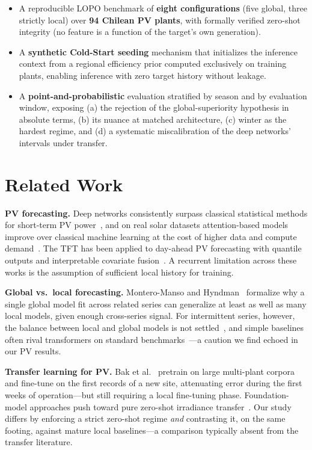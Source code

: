 \documentclass[conference]{IEEEtran}
\begin{document}
\begin{itemize}
\item A reproducible LOPO benchmark of \textbf{eight configurations} (five global, three
strictly local) over \textbf{94 Chilean PV plants}, with formally verified zero-shot
integrity (no feature is a function of the target's own generation).
\item A \textbf{synthetic Cold-Start seeding} mechanism that initializes the inference
context from a regional efficiency prior computed exclusively on training plants, enabling
inference with zero target history without leakage.
\item A \textbf{point-and-probabilistic} evaluation stratified by season and by evaluation
window, exposing (a) the rejection of the global-superiority hypothesis in absolute terms,
(b) its nuance at matched architecture, (c) winter as the hardest regime, and (d) a
systematic miscalibration of the deep networks' intervals under transfer.
\end{itemize}

\section{Related Work}
\textbf{PV forecasting.} Deep networks consistently surpass classical statistical methods
for short-term PV power~\cite{Mellit2021,Kumari2021}, and on real solar datasets
attention-based models improve over classical machine learning at the cost of higher data
and compute demand~\cite{Arslan2025}. The TFT has been applied to day-ahead PV forecasting
with quantile outputs and interpretable covariate fusion~\cite{LopezSantos2022}. A recurrent
limitation across these works is the assumption of sufficient local history for training.

\textbf{Global vs.\ local forecasting.} Montero-Manso and Hyndman~\cite{MonteroManso2021}
formalize why a single global model fit across related series can generalize at least as
well as many local models, given enough cross-series signal. For intermittent series,
however, the balance between local and global models is not settled~\cite{Damato2026}, and
simple baselines often rival transformers on standard benchmarks~\cite{Zeng2023}---a caution
we find echoed in our PV results.

\textbf{Transfer learning for PV.} Bak et al.~\cite{Bak2025} pretrain on large multi-plant
corpora and fine-tune on the first records of a new site, attenuating error during the first
weeks of operation---but still requiring a local fine-tuning phase. Foundation-model
approaches push toward pure zero-shot irradiance transfer~\cite{Mishra2025}. Our study
differs by enforcing a strict zero-shot regime \emph{and} contrasting it, on the same
footing, against mature local baselines---a comparison typically absent from the transfer
literature.
\end{document}
